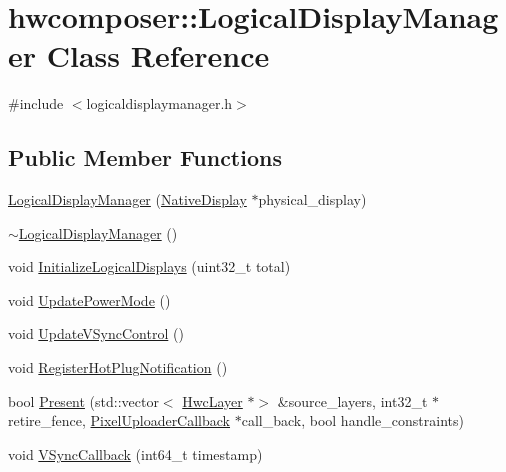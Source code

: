 \hypertarget{classhwcomposer_1_1LogicalDisplayManager}{}\section{hwcomposer\+:\+:Logical\+Display\+Manager Class Reference}
\label{classhwcomposer_1_1LogicalDisplayManager}


{\ttfamily \#include $<$logicaldisplaymanager.\+h$>$}

\subsection*{Public Member Functions}
\begin{DoxyCompactItemize}
\item 
\mbox{\hyperlink{classhwcomposer_1_1LogicalDisplayManager_a0831d51c9223869945fd1dbb1c7a2472}{Logical\+Display\+Manager}} (\mbox{\hyperlink{classhwcomposer_1_1NativeDisplay}{Native\+Display}} $\ast$physical\+\_\+display)
\item 
\mbox{\hyperlink{classhwcomposer_1_1LogicalDisplayManager_a3eca76258ea847e523a15acb1f558069}{$\sim$\+Logical\+Display\+Manager}} ()
\item 
void \mbox{\hyperlink{classhwcomposer_1_1LogicalDisplayManager_a009d47157fe5b3290d9cbe3faa3414b0}{Initialize\+Logical\+Displays}} (uint32\+\_\+t total)
\item 
void \mbox{\hyperlink{classhwcomposer_1_1LogicalDisplayManager_a8a297a2d1b94f5db2e3cf0b209abbecd}{Update\+Power\+Mode}} ()
\item 
void \mbox{\hyperlink{classhwcomposer_1_1LogicalDisplayManager_aa3d7e2fdfaf389a38dc07861b980b81b}{Update\+V\+Sync\+Control}} ()
\item 
void \mbox{\hyperlink{classhwcomposer_1_1LogicalDisplayManager_a3ce0f929bd07deb3b9f1bcf146a3cf3d}{Register\+Hot\+Plug\+Notification}} ()
\item 
bool \mbox{\hyperlink{classhwcomposer_1_1LogicalDisplayManager_af8fd8256d46d61b64cb53371d86aaff0}{Present}} (std\+::vector$<$ \mbox{\hyperlink{structhwcomposer_1_1HwcLayer}{Hwc\+Layer}} $\ast$$>$ \&source\+\_\+layers, int32\+\_\+t $\ast$retire\+\_\+fence, \mbox{\hyperlink{classhwcomposer_1_1PixelUploaderCallback}{Pixel\+Uploader\+Callback}} $\ast$call\+\_\+back, bool handle\+\_\+constraints)
\item 
void \mbox{\hyperlink{classhwcomposer_1_1LogicalDisplayManager_a799b4d580b33a54016d7694380aefcec}{V\+Sync\+Callback}} (int64\+\_\+t timestamp)
$$
\end{DoxyCompactItemize}
